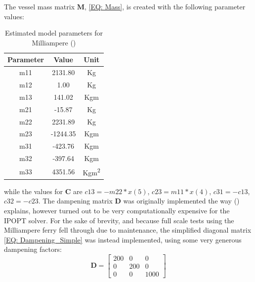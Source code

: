 The vessel mass matrix $\textbf{M}$, \eqref{EQ: Mass}, is created with the following parameter values:
\begin{table}[ht!]
    \begin{center}
        \caption{Estimated model parameters for Milliampere (\cite{pedersen2019optimization})}
        \label{TAB: Model parameter values}
        \begin{tabular}{c|c|c}
            \hline
            \textbf{Parameter} & \textbf{Value} & \textbf{Unit}\\
            \hline
            m11 & 2131.80 & Kg\\
            m12 & 1.00    & Kg \\
            m13 & 141.02  & Kgm\\
            m21 & -15.87  & Kg\\
            m22 & 2231.89 & Kg\\
            m23 & -1244.35 & Kgm\\
            m31 & -423.76 & Kgm\\
            m32 & -397.64 & Kgm\\
            m33 & 4351.56 & Kgm\textsuperscript{2}\\
        \end{tabular}
    \end{center}
\end{table}
while the values for $\textbf{C}$ are $c13 = -m22*x(5)$, $c23 = m11*x(4)$, $c31 = -c13$, $c32 = -c23$. The dampening matrix $\textbf{D}$ was originally
implemented the way (\cite{pedersen2019optimization}) explains, however turned out to be very computationally expensive for the \gls{IPOPT} solver.
For the sake of brevity, and because full scale tests using the Milliampere ferry fell through due to maintenance, the simplified diagonal matrix \eqref{EQ: Dampening_Simple}
was instead implemented, using some very generous dampening factors:
\begin{equation} \label{EQ: Dampening_method}
    \textbf{D} = \begin{bmatrix}
        200 & 0 & 0\\
        0 & 200 & 0\\
        0 & 0 & 1000
    \end{bmatrix}
\end{equation}


